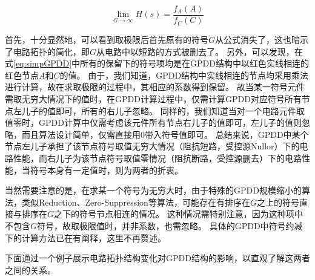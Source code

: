 \begin{equation}
\label{eq:simpGPDD}
\mathop {\lim }\limits_{G \to \infty } H \left( s \right) = \frac{{f_A}\left( A \right)}{{f_C}\left( C \right)}
\end{equation}

首先，十分显然地，可以看到取极限后首先原有的符号$G$从公式消失了，这也暗示了电路拓扑的简化，即$G$从电路中以短路的方式被删去了。
另外，可以发现，在式\ref{eq:simpGPDD}中所有的保留下的符号项均是在GPDD结构中以红色实线相连的红色节点$A$和$C$的值。
由于，我们知道，GPDD结构中实线相连的节点均采用乘法进行计算，故在求取极限的过程中，其相应的系数得到保留。
故当某一符号元件需取无穷大情况下的值时，在GPDD计算过程中，仅需计算GPDD对应符号所有节点左儿子的值即可，所有的右儿子忽略。
同样的，我们知道当对一个电路元件取值零时，GPDD计算中仅需考虑该元件所有节点右儿子的值即可，左儿子的值则忽略，而且算法设计简单，仅需直接用0带入符号值即可。
总结来说，GPDD中某个节点左儿子承担了该节点符号取值无穷大情况（阻抗短路，受控源Nullor）下的电路性能，而右儿子为该节点符号取值零情况（阻抗断路，受控源删去）下的电路性能，当符号本身有一定值时，则为两者的折衷。

当然需要注意的是，在求某一个符号为无穷大时，由于特殊的GPDD规模缩小的算法，类似Reduction、Zero-Suppression等算法\parencite{GShi-GPDD-2013,GShi-GPDD}，可能存在有排序在$G$之上的符号直接与排序在$G$之下的符号节点相连的情况。
这种情况需特别注意，因为这种项中不包含$G$符号，故取极限值时，并非系数，也需忽略。
具体的GPDD中符号约减下的计算方法已在\parencite{HanbinHu-Thesis}有阐释，这里不再赘述。

下面通过一个例子展示电路拓扑结构变化对GPDD结构的影响，以直观了解这两者之间的关系。

